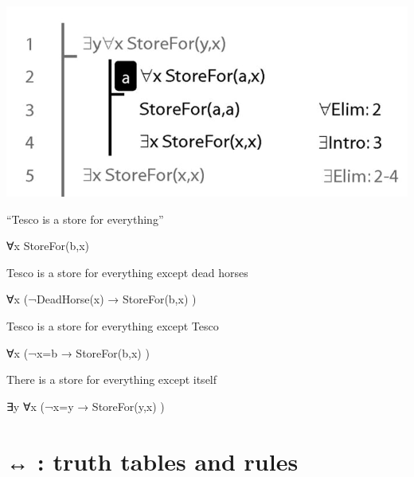 \documentclass[12pt]{extarticle}
\begin{document}
\begin{multicols*}{3}
\begin{center}
\includegraphics[scale=0.3]{img/unit_565_proof.png}
\end{center}
“Tesco is a store for everything”
 
∀x StoreFor(b,x)
 
Tesco is a store for everything except dead horses
 
∀x (¬DeadHorse(x) → StoreFor(b,x) )
 
Tesco is a store for everything except Tesco
 
∀x (¬x=b → StoreFor(b,x) )
 
There is a store for everything except itself
 
∃y ∀x (¬x=y → StoreFor(y,x) )
 
 
 
\section{↔ : truth tables and rules}
 

\end{multicols*}
\end{document}

